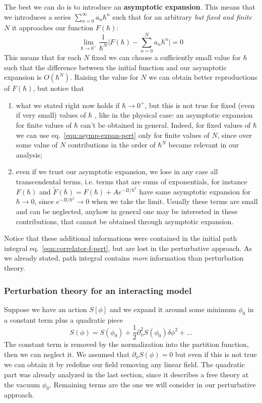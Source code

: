 \documentclass[../main/main.tex]{subfiles}
\begin{document}
The best we can do is to introduce an \textbf{asymptotic expansion}. This means that we introduces a series $\sum_{n=0}^\infty a_n\hbar^n$ such that for an arbitrary \emph{but fixed and finite} $N$ it approaches our function $F(\hbar)$:
\begin{equation}\label{eqn:asymp-expan-pert}
\lim_{\hbar\to0^+}\frac1{\hbar^N}\Bigg\vert F(\hbar)-\sum_{n=0}^Na_n\hbar^n\Bigg\vert=0
\end{equation}
This means that for each $N$ fixed we can choose a sufficiently small value for $\hbar$ such that the difference between the initial function and our asymptotic expansion is $O(\hbar^N)$. Raising the value for $N$ we can obtain better reproductions of $F(\hbar)$, but notice that 
\begin{enumerate}[label=\textbullet]
\item what we stated right now holds if $\hbar\to0^+$, but this is not true  for fixed (even if very small) values of $\hbar$ , like in the physical case: an asymptotic expansion for finite values of $\hbar$ can't be obtained in general. Indeed, for fixed values of $\hbar$ we can use eq.~\eqref{eqn:asymp-expan-pert} only for finite values of $N$, since over some value of $N$ contributions in the order of $\hbar^N$ became relevant in our analysis;
\item even if we trust our asymptotic expansion, we lose in any case all transcendental terms, i.e. terms that are sums of exponentials, for instance $F(\hbar)$ and $\widetilde F(\hbar)=F(\hbar)+Ae^{-B/\hbar^2}$ have same asymptotic expansion for $\hbar\to0$, since $e^{-B/\hbar^2}\to0$ when we take the limit. Usually these terms are small and can be neglected, anyhow in general one may be interested in these contributions, that cannot be obtained through asymptotic expansion. 
\end{enumerate}
Notice that these additional informations were contained in the initial path integral eq.~\eqref{eqn:correlator-f-pert}, but are lost in the perturbative approach. As we already stated, path integral contains \emph{more} information than perturbation theory. 

\subsubsection{Perturbation theory for an interacting model}

Suppose we have an action $S[\phi]$ and we expand it around some minimum $\phi_0$  in a constant term plus a quadratic piece
\[S(\phi)=S(\phi_0)+\frac12\partial_\phi^2S(\phi_0)\delta\phi^2+\dots\]
The constant term is removed by the normalization into the partition function, then we can neglect it. We assumed that $\partial_\phi S(\phi)=0$ but even if this is not true we can obtain it by redefine our field removing any linear field. The quadratic part was already analyzed in the last section, since it describes a free theory at the vacuum $\phi_0$. Remaining terms are the one we will consider in our perturbative approach. 
\end{document}
